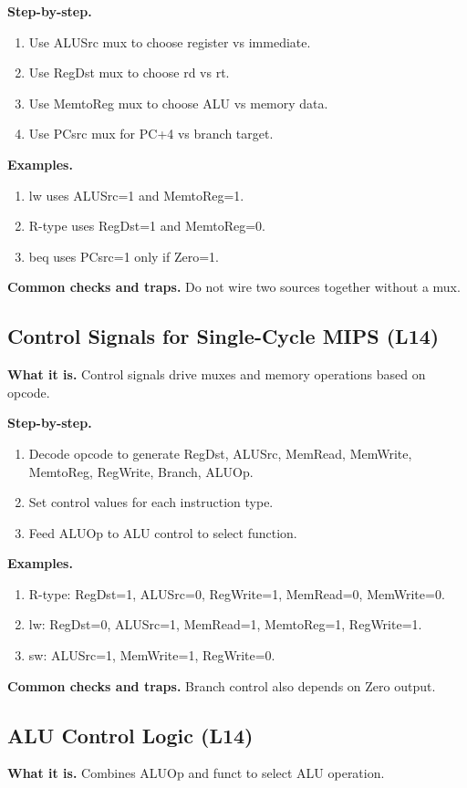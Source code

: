 \documentclass[11pt]{article}
\begin{document}
\textbf{Step-by-step.}
\begin{enumerate}[leftmargin=*]
  \item Use ALUSrc mux to choose register vs immediate.
  \item Use RegDst mux to choose rd vs rt.
  \item Use MemtoReg mux to choose ALU vs memory data.
  \item Use PCsrc mux for PC+4 vs branch target.
\end{enumerate}

\textbf{Examples.}
\begin{enumerate}[leftmargin=*]
  \item lw uses ALUSrc=1 and MemtoReg=1.
  \item R-type uses RegDst=1 and MemtoReg=0.
  \item beq uses PCsrc=1 only if Zero=1.
\end{enumerate}

\textbf{Common checks and traps.} Do not wire two sources together without a mux.

\subsection{Control Signals for Single-Cycle MIPS (L14)}
\textbf{What it is.} Control signals drive muxes and memory operations based on opcode.

\textbf{Step-by-step.}
\begin{enumerate}[leftmargin=*]
  \item Decode opcode to generate RegDst, ALUSrc, MemRead, MemWrite, MemtoReg, RegWrite, Branch, ALUOp.
  \item Set control values for each instruction type.
  \item Feed ALUOp to ALU control to select function.
\end{enumerate}

\textbf{Examples.}
\begin{enumerate}[leftmargin=*]
  \item R-type: RegDst=1, ALUSrc=0, RegWrite=1, MemRead=0, MemWrite=0.
  \item lw: RegDst=0, ALUSrc=1, MemRead=1, MemtoReg=1, RegWrite=1.
  \item sw: ALUSrc=1, MemWrite=1, RegWrite=0.
\end{enumerate}

\textbf{Common checks and traps.} Branch control also depends on Zero output.

\subsection{ALU Control Logic (L14)}
\textbf{What it is.} Combines ALUOp and funct to select ALU operation.
\end{document}
